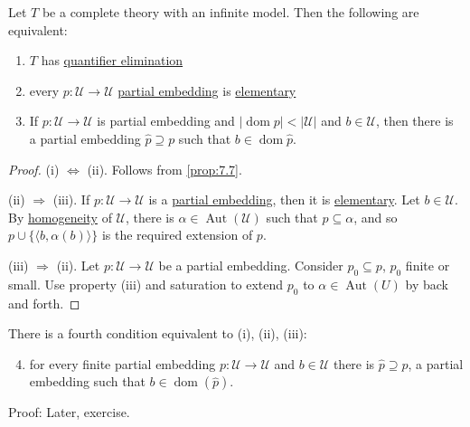 \documentclass{article}
\DeclareMathOperator{\Aut}{Aut}
\DeclareMathOperator{\dom}{dom}
\DeclareMathOperator{\img}{img}
\newcommand{\named}[1]{\textbf{#1}\index{#1}}
\begin{document}
\begin{nthm}
  Let $T$ be a complete theory with an infinite model. Then the following are equivalent:
  \begin{enumerate}[label=(\roman*)]
    \item $T$ has \hyperlink{def:qe}{quantifier elimination}
    \item every $p: \mathcal{U} \to \mathcal{U}$ \hyperlink{def:upe}{partial embedding} is \hyperlink{def:el}{elementary}
    \item If $p: \mathcal{U} \to \mathcal{U}$ is partial embedding and $|\dom p| < |\mathcal{U}|$ and $b \in \mathcal{U}$, then there is a partial embedding $\hat{p} \supseteq p$ such that $b \in \dom \hat{p}$.
  \end{enumerate}
\end{nthm}
\begin{proof}
  (i) $\Leftrightarrow$ (ii). Follows from \cref{prop:7.7}.

  (ii) $\Rightarrow$ (iii). If $p: \mathcal{U} \to \mathcal{U}$ is a \hyperlink{def:upe}{partial embedding}, then it is \hyperlink{def:elmap}{elementary}.
  Let $b \in \mathcal{U}$.
  By \hyperlink{def:homogeneous}{homogeneity} of $\mathcal{U}$, there is $\alpha \in \Aut(\mathcal{U})$ such that $p \subseteq \alpha$, and so $p \cup \{\langle b, \alpha(b) \rangle \}$ is the required extension of $p$.

  (iii) $\Rightarrow$ (ii). Let $p: \mathcal{U} \to \mathcal{U}$ be a partial embedding.
  Consider $p_0 \subseteq p$, $p_0$ finite or small. Use property (iii) and saturation to extend $p_0$ to $\alpha \in \Aut(U)$ by back and forth.
\end{proof}
\begin{remark}
  There is a fourth condition equivalent to (i), (ii), (iii):
  \begin{enumerate}[label=(\roman*)]\setcounter{enumi}{3}
    \item for every finite partial embedding $p: \mathcal{U} \to \mathcal{U}$ and $b \in \mathcal{U}$ there is $\hat{p} \supseteq p$, a partial embedding such that $b \in \dom(\hat{p})$.
  \end{enumerate}

  Proof: Later, exercise.
\end{remark}
\end{document}
